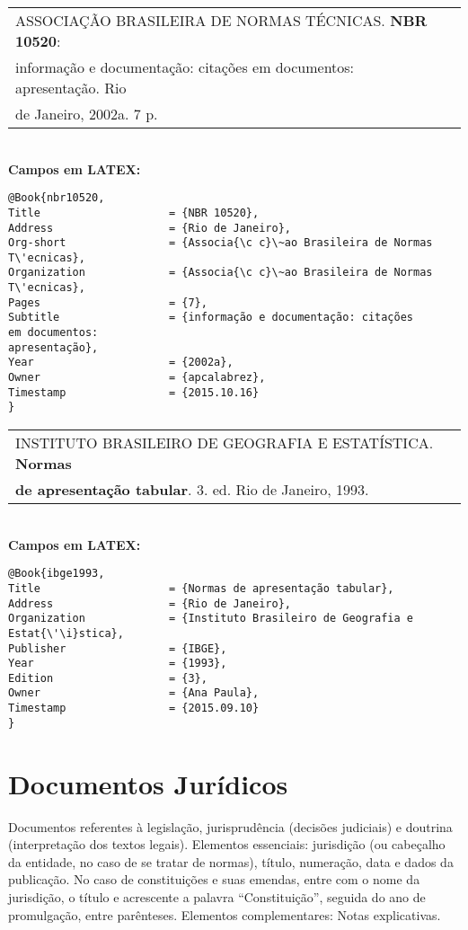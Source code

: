 \begin{tabular}{|l|c|} \hline
ASSOCIAÇÃO BRASILEIRA DE NORMAS TÉCNICAS. \textbf{NBR 10520}: \\informação e documentação: citações em documentos: apresentação. Rio \\de Janeiro, 2002a. 7 p. 
	\\\hline
\end{tabular} \\

\textbf{Campos em LATEX:} 

\begin{verbatim}
@Book{nbr10520,
Title                    = {NBR 10520},
Address                  = {Rio de Janeiro},
Org-short                = {Associa{\c c}\~ao Brasileira de Normas 
T\'ecnicas},
Organization             = {Associa{\c c}\~ao Brasileira de Normas 
T\'ecnicas},
Pages                    = {7},
Subtitle                 = {informação e documentação: citações 
em documentos: 
apresentação},
Year                     = {2002a},
Owner                    = {apcalabrez},
Timestamp                = {2015.10.16}
}
\end{verbatim}

\begin{tabular}{|l|c|} \hline
INSTITUTO BRASILEIRO DE GEOGRAFIA E ESTATÍSTICA. \textbf{Normas} \\ \textbf{de apresentação tabular}. 3. ed. Rio de Janeiro, 1993. 
	\\\hline
\end{tabular} \\

\textbf{Campos em LATEX:} 

\begin{verbatim}
@Book{ibge1993,
Title                    = {Normas de apresentação tabular},
Address                  = {Rio de Janeiro},
Organization             = {Instituto Brasileiro de Geografia e 
Estat{\'\i}stica},
Publisher                = {IBGE},
Year                     = {1993},
Edition                  = {3},
Owner                    = {Ana Paula},
Timestamp                = {2015.09.10}
}

\end{verbatim}
\section{Documentos Jurídicos}

Documentos referentes à legislação, jurisprudência (decisões judiciais) e
doutrina (interpretação dos textos legais).
Elementos essenciais: jurisdição (ou cabeçalho da entidade, no caso de
se tratar de normas), título, numeração, data e dados da publicação. No
caso de constituições e suas emendas, entre com o nome da jurisdição, o
título e acrescente a palavra “Constituição”, seguida do ano de
promulgação, entre parênteses.
Elementos complementares: Notas explicativas. \\

